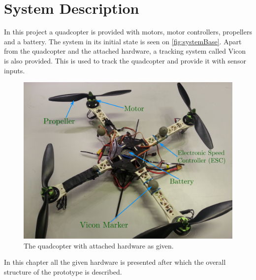 \chapter{System Description}
In this project a quadcopter is provided with motors, motor controllers, propellers and a battery. The system in its initial state is seen on \autoref{fig:systemBase}. Apart from the quadcopter and the attached hardware, a tracking system called Vicon is also provided. This is used to track the quadcopter and provide it with sensor inputs.

\begin{figure}[H]
  \centering
  \includegraphics[width=.6\linewidth]{figures/quadcopterBaseLabels}
  \caption{The quadcopter with attached hardware as given.}
  \label{fig:systemBase}
\end{figure}

In this chapter all the given hardware is presented after which the overall structure of the prototype is described.